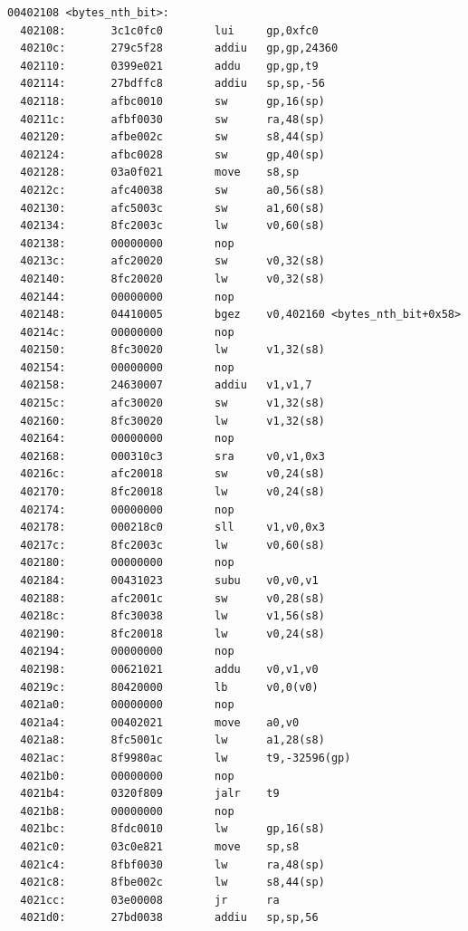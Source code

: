 \documentclass[11pt]{article}
\begin{document}
\begin{verbatim}
00402108 <bytes_nth_bit>:
  402108:       3c1c0fc0        lui     gp,0xfc0
  40210c:       279c5f28        addiu   gp,gp,24360
  402110:       0399e021        addu    gp,gp,t9
  402114:       27bdffc8        addiu   sp,sp,-56
  402118:       afbc0010        sw      gp,16(sp)
  40211c:       afbf0030        sw      ra,48(sp)
  402120:       afbe002c        sw      s8,44(sp)
  402124:       afbc0028        sw      gp,40(sp)
  402128:       03a0f021        move    s8,sp
  40212c:       afc40038        sw      a0,56(s8)
  402130:       afc5003c        sw      a1,60(s8)
  402134:       8fc2003c        lw      v0,60(s8)
  402138:       00000000        nop
  40213c:       afc20020        sw      v0,32(s8)
  402140:       8fc20020        lw      v0,32(s8)
  402144:       00000000        nop
  402148:       04410005        bgez    v0,402160 <bytes_nth_bit+0x58>
  40214c:       00000000        nop
  402150:       8fc30020        lw      v1,32(s8)
  402154:       00000000        nop
  402158:       24630007        addiu   v1,v1,7
  40215c:       afc30020        sw      v1,32(s8)
  402160:       8fc30020        lw      v1,32(s8)
  402164:       00000000        nop
  402168:       000310c3        sra     v0,v1,0x3
  40216c:       afc20018        sw      v0,24(s8)
  402170:       8fc20018        lw      v0,24(s8)
  402174:       00000000        nop
  402178:       000218c0        sll     v1,v0,0x3
  40217c:       8fc2003c        lw      v0,60(s8)
  402180:       00000000        nop
  402184:       00431023        subu    v0,v0,v1
  402188:       afc2001c        sw      v0,28(s8)
  40218c:       8fc30038        lw      v1,56(s8)
  402190:       8fc20018        lw      v0,24(s8)
  402194:       00000000        nop
  402198:       00621021        addu    v0,v1,v0
  40219c:       80420000        lb      v0,0(v0)
  4021a0:       00000000        nop
  4021a4:       00402021        move    a0,v0
  4021a8:       8fc5001c        lw      a1,28(s8)
  4021ac:       8f9980ac        lw      t9,-32596(gp)
  4021b0:       00000000        nop
  4021b4:       0320f809        jalr    t9
  4021b8:       00000000        nop
  4021bc:       8fdc0010        lw      gp,16(s8)
  4021c0:       03c0e821        move    sp,s8
  4021c4:       8fbf0030        lw      ra,48(sp)
  4021c8:       8fbe002c        lw      s8,44(sp)
  4021cc:       03e00008        jr      ra
  4021d0:       27bd0038        addiu   sp,sp,56


\end{verbatim}
\end{document}
